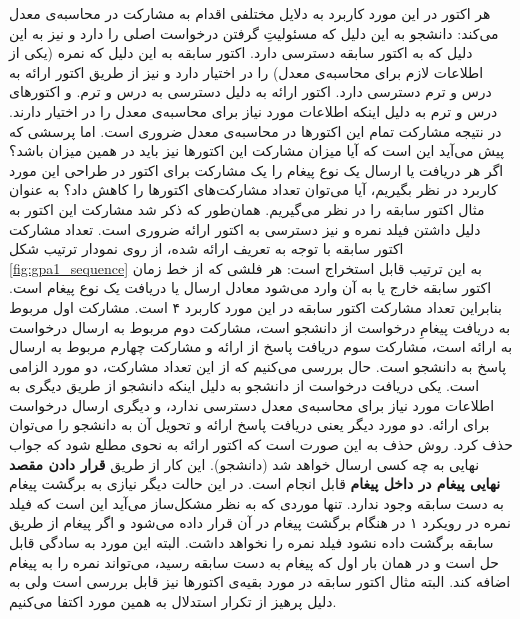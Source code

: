 هر اکتور در این مورد کاربرد به دلایل مختلفی اقدام به مشارکت در محاسبه‌ی معدل می‌کند: دانشجو به این دلیل که مسئولیتِ گرفتن درخواست اصلی را دارد و نیز به این دلیل که به اکتور سابقه دسترسی دارد. اکتور سابقه به این دلیل که نمره (یکی از اطلاعات لازم برای محاسبه‌ی معدل) را در اختیار دارد و نیز از طریق اکتور ارائه به درس و ترم دسترسی دارد. اکتور ارائه به دلیل دسترسی به درس و ترم. و اکتورهای درس و ترم به دلیل اینکه اطلاعات مورد نیاز برای محاسبه‌ی معدل را در اختیار دارند. در نتیجه مشارکت تمام این اکتورها در محاسبه‌ی معدل ضروری است. اما پرسشی که پیش می‌آید این است که آیا میزان مشارکت این اکتورها نیز باید در همین میزان باشد؟ اگر هر دریافت یا ارسال یک نوع پیغام را یک مشارکت برای اکتور در طراحی این مورد کاربرد در نظر بگیریم، آیا می‌توان تعداد مشارکت‌های اکتورها را کاهش داد؟ به عنوان مثال اکتور سابقه را در نظر می‌گیریم. همان‌طور که ذکر شد مشارکت این اکتور به دلیل داشتن فیلد نمره و نیز دسترسی به اکتور ارائه ضروری است. تعداد مشارکت اکتور  سابقه با توجه به تعریف ارائه شده، از روی نمودار ترتیب شکل \ref{fig:gpa1_sequence} به این ترتیب قابل استخراج است: هر فلشی که از خط زمان اکتور سابقه خارج یا به آن وارد می‌شود معادل ارسال یا دریافت یک نوع پیغام است. بنابراین تعداد مشارکت اکتور سابقه در این مورد کاربرد ۴ است. مشارکت اول مربوط به دریافت پیغامِ درخواست از دانشجو است، مشارکت دوم مربوط به ارسال درخواست به ارائه است، مشارکت سوم دریافت پاسخ از ارائه و مشارکت چهارم مربوط به ارسال پاسخ به دانشجو است. حال بررسی می‌کنیم که از این تعداد مشارکت، دو مورد الزامی است. یکی دریافت درخواست از دانشجو به دلیل اینکه دانشجو از طریق دیگری به اطلاعات مورد نیاز برای محاسبه‌ی معدل دسترسی ندارد، و دیگری ارسال درخواست برای ارائه. دو مورد دیگر یعنی دریافت پاسخ ارائه و تحویل آن به دانشجو را می‌توان حذف کرد. روش حذف به این صورت است که اکتور ارائه به نحوی مطلع شود که جواب نهایی به چه کسی ارسال خواهد شد (دانشجو). این کار از طریق \textbf{قرار دادن مقصد نهایی پیغام در داخل پیغام} قابل انجام است. در این حالت دیگر نیازی به برگشت پیغام به دست سابقه وجود ندارد. تنها موردی که به نظر مشکل‌ساز می‌آید این است که فیلد نمره در رویکرد ۱ در هنگام برگشت پیغام در  آن قرار داده می‌شود و اگر پیغام از طریق سابقه برگشت داده نشود فیلد نمره را نخواهد داشت. البته این مورد به سادگی قابل حل است و در همان بار اول که پیغام به دست سابقه رسید، می‌تواند نمره را به پیغام اضافه کند. البته مثال اکتور سابقه در مورد بقیه‌ی اکتورها نیز قابل بررسی است ولی به دلیل پرهیز از تکرار استدلال به همین مورد اکتفا می‌کنیم.\\
